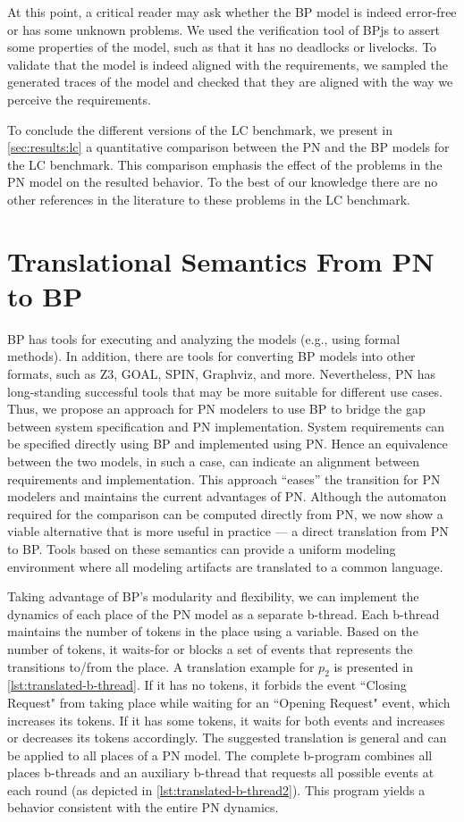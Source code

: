 \documentclass[10pt,journal,compsoc]{IEEEtran}
\theoremstyle{definition}
\begin{document}
At this point, a critical reader may ask whether the BP model is indeed error-free or has some unknown problems. We used the verification tool of BPjs to assert some properties of the model, such as that it has no deadlocks or livelocks. To validate that the model is indeed aligned with the requirements, we sampled the generated traces of the model and checked that they are aligned with the way we perceive the requirements. 

To conclude the different versions of the LC benchmark, we present in \autoref{sec:results:lc} a quantitative comparison between the PN and the BP models for the LC benchmark. This comparison emphasis the effect of the problems in the PN model on the resulted behavior. To the best of our knowledge there are no other references in the literature to these problems in the LC benchmark.

\section{Translational Semantics From PN to BP}
\label{sec:semantics}
BP has tools for executing and analyzing the models (e.g., using formal methods). In addition, there are tools for converting BP models into other formats, such as Z3, GOAL, SPIN, Graphviz, and more. Nevertheless, PN has long-standing successful tools that may be more suitable for different use cases. Thus, we propose an approach for PN modelers to use BP to bridge the gap between system specification and PN implementation. System requirements can be specified directly using BP and implemented using PN. Hence an equivalence between the two models, in such a case, can indicate an alignment between requirements and implementation. This approach ``eases'' the transition for PN modelers and maintains the current advantages of PN. Although the automaton required for the comparison can be computed directly from PN, we now show a viable alternative that is more useful in practice --- a direct translation from PN to BP. Tools based on these semantics can provide a uniform modeling environment where all modeling artifacts are translated to a common language.

Taking advantage of BP's modularity and flexibility, we can implement the dynamics of each place of the PN model as a separate b-thread. Each b-thread maintains the number of tokens in the place using a variable. Based on the number of tokens, it waits-for or blocks a set of events that represents the transitions to/from the place. A translation example for $p_2$ is presented in \autoref{lst:translated-b-thread}. If it has no tokens, it forbids the event ``Closing Request" from taking place while waiting for an ``Opening Request" event, which increases its tokens. If it has some tokens, it waits for both events and increases or decreases its tokens accordingly. The suggested translation is general and can be applied to all places of a PN model. The complete b-program combines all places b-threads and an auxiliary b-thread that requests all possible events at each round (as depicted in \autoref{lst:translated-b-thread2}). This program yields a behavior consistent with the entire PN dynamics.
\end{document}

